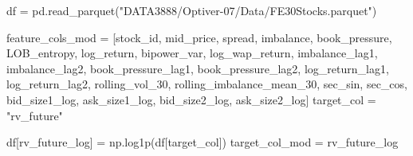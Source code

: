 \documentclass[
  letterpaper,
  DIV=11,
  numbers=noendperiod]{scrartcl}
\newenvironment{Shaded}{\begin{snugshade}}{\end{snugshade}}
\newcommand{\NormalTok}[1]{\textcolor[rgb]{0.00,0.23,0.31}{#1}}
\newcommand{\OperatorTok}[1]{\textcolor[rgb]{0.37,0.37,0.37}{#1}}
\newcommand{\StringTok}[1]{\textcolor[rgb]{0.13,0.47,0.30}{#1}}
\begin{document}
\begin{Shaded}
\begin{Highlighting}[]
\NormalTok{df }\OperatorTok{=}\NormalTok{ pd.read\_parquet(}\StringTok{"DATA3888/Optiver{-}07/Data/FE30Stocks.parquet"}\NormalTok{)}

\NormalTok{feature\_cols\_mod }\OperatorTok{=}\NormalTok{ [}\StringTok{\textquotesingle{}stock\_id\textquotesingle{}}\NormalTok{, }\StringTok{\textquotesingle{}mid\_price\textquotesingle{}}\NormalTok{, }\StringTok{\textquotesingle{}spread\textquotesingle{}}\NormalTok{, }\StringTok{\textquotesingle{}imbalance\textquotesingle{}}\NormalTok{,}
       \StringTok{\textquotesingle{}book\_pressure\textquotesingle{}}\NormalTok{, }\StringTok{\textquotesingle{}LOB\_entropy\textquotesingle{}}\NormalTok{, }\StringTok{\textquotesingle{}log\_return\textquotesingle{}}\NormalTok{, }\StringTok{\textquotesingle{}bipower\_var\textquotesingle{}}\NormalTok{,}
       \StringTok{\textquotesingle{}log\_wap\_return\textquotesingle{}}\NormalTok{, }\StringTok{\textquotesingle{}imbalance\_lag1\textquotesingle{}}\NormalTok{, }\StringTok{\textquotesingle{}imbalance\_lag2\textquotesingle{}}\NormalTok{,}
       \StringTok{\textquotesingle{}book\_pressure\_lag1\textquotesingle{}}\NormalTok{, }\StringTok{\textquotesingle{}book\_pressure\_lag2\textquotesingle{}}\NormalTok{, }\StringTok{\textquotesingle{}log\_return\_lag1\textquotesingle{}}\NormalTok{,}
       \StringTok{\textquotesingle{}log\_return\_lag2\textquotesingle{}}\NormalTok{, }\StringTok{\textquotesingle{}rolling\_vol\_30\textquotesingle{}}\NormalTok{, }\StringTok{\textquotesingle{}rolling\_imbalance\_mean\_30\textquotesingle{}}\NormalTok{,}
       \StringTok{\textquotesingle{}sec\_sin\textquotesingle{}}\NormalTok{, }\StringTok{\textquotesingle{}sec\_cos\textquotesingle{}}\NormalTok{, }\StringTok{\textquotesingle{}bid\_size1\_log\textquotesingle{}}\NormalTok{, }\StringTok{\textquotesingle{}ask\_size1\_log\textquotesingle{}}\NormalTok{, }\StringTok{\textquotesingle{}bid\_size2\_log\textquotesingle{}}\NormalTok{,}
       \StringTok{\textquotesingle{}ask\_size2\_log\textquotesingle{}}\NormalTok{]}
\NormalTok{target\_col }\OperatorTok{=} \StringTok{"rv\_future"}

\NormalTok{df[}\StringTok{\textquotesingle{}rv\_future\_log\textquotesingle{}}\NormalTok{] }\OperatorTok{=}\NormalTok{ np.log1p(df[target\_col])}
\NormalTok{target\_col\_mod   }\OperatorTok{=} \StringTok{\textquotesingle{}rv\_future\_log\textquotesingle{}}
\end{Highlighting}
\end{Shaded}
\end{document}
